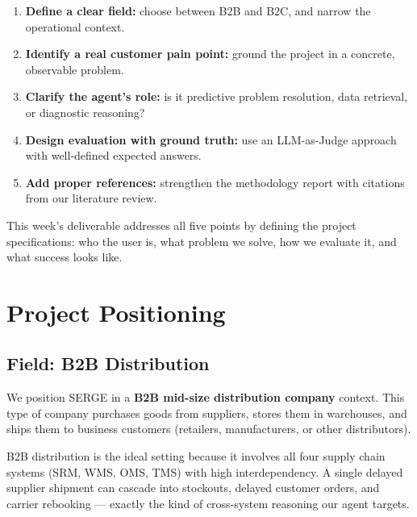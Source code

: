 \documentclass[11pt,a4paper]{article}
\begin{document}
\begin{enumerate}[itemsep=0.5em]
    \item \textbf{Define a clear field:} choose between B2B and B2C, and narrow the operational context.
    \item \textbf{Identify a real customer pain point:} ground the project in a concrete, observable problem.
    \item \textbf{Clarify the agent's role:} is it predictive problem resolution, data retrieval, or diagnostic reasoning?
    \item \textbf{Design evaluation with ground truth:} use an LLM-as-Judge approach with well-defined expected answers.
    \item \textbf{Add proper references:} strengthen the methodology report with citations from our literature review.
\end{enumerate}

This week's deliverable addresses all five points by defining the project specifications: who the user is, what problem we solve, how we evaluate it, and what success looks like.

\section{Project Positioning}

\subsection{Field: B2B Distribution}

We position SERGE in a \textbf{B2B mid-size distribution company} context. This type of company purchases goods from suppliers, stores them in warehouses, and ships them to business customers (retailers, manufacturers, or other distributors).

\begin{keyinsight}
B2B distribution is the ideal setting because it involves all four supply chain systems (SRM, WMS, OMS, TMS) with high interdependency. A single delayed supplier shipment can cascade into stockouts, delayed customer orders, and carrier rebooking --- exactly the kind of cross-system reasoning our agent targets.
\end{keyinsight}

\vspace{0.5em}
\end{document}
